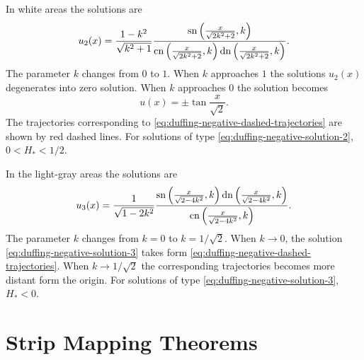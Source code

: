 In white areas the solutions are
\begin{equation}
	u_2(x) = \frac{1 - k^2}{\sqrt{k^2 + 1}} \frac{\mathop\mathrm{sn} \left( \frac{x}{\sqrt{2k^2 + 2}}, k \right)}{\mathrm{cn} \left( \frac{x}{\sqrt{2k^2 + 2}}, k \right) \mathop\mathrm{dn} \left( \frac{x}{\sqrt{2k^2 + 2}}, k \right)}.
\label{eq:duffing-negative-solution-2}
\end{equation}
The parameter $k$ changes from $0$ to $1$.
When $k$ approaches $1$ the solutions $u_2(x)$ degenerates into zero solution.
When $k$ approaches $0$ the solution becomes
\begin{equation}
	u(x) = \pm \tan \frac{x}{\sqrt{2}}.
\label{eq:duffing-negative-dashed-trajectories}
\end{equation}
The trajectories corresponding to \eqref{eq:duffing-negative-dashed-trajectories} are shown by red dashed lines.
For solutions of type \eqref{eq:duffing-negative-solution-2}, $0 < H_* < 1/2$.

In the light-gray areas the solutions are
\begin{equation}
	u_3(x) = \frac{1}{\sqrt{1 - 2k^2}} \frac{\mathop\mathrm{sn} \left( \frac{x}{\sqrt{2 - 4k^2}}, k \right) \mathop\mathrm{dn} \left( \frac{x}{\sqrt{2 - 4k^2}}, k \right)}{\mathrm{cn} \left( \frac{x}{\sqrt{2 - 4k^2}}, k \right)}.
\label{eq:duffing-negative-solution-3}
\end{equation}
The parameter $k$ changes from $k = 0$ to $k = 1 / \sqrt{2}$.
When $k \to 0$, the solution \eqref{eq:duffing-negative-solution-3} takes form \eqref{eq:duffing-negative-dashed-trajectories}.
When $k \to 1 / \sqrt{2}$ the corresponding trajectories becomes more distant form the origin.
For solutions of type \eqref{eq:duffing-negative-solution-3}, $H_* < 0$.

\chapter{Strip Mapping Theorems}
\label{appendix:strips-mapping-theorems}

